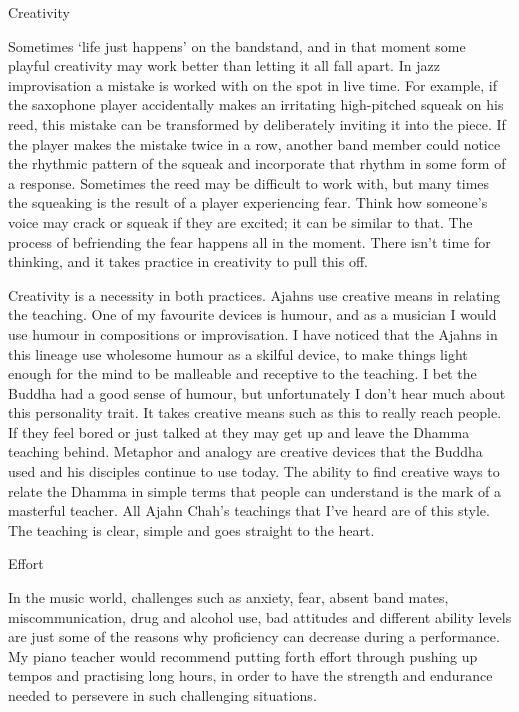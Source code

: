 Creativity

Sometimes `life just happens' on the bandstand, and in that moment some
playful creativity may work better than letting it all fall apart. In
jazz improvisation a mistake is worked with on the spot in live time.
For example, if the saxophone player accidentally makes an irritating
high-pitched squeak on his reed, this mistake can be transformed by
deliberately inviting it into the piece. If the player makes the mistake
twice in a row, another band member could notice the rhythmic pattern of
the squeak and incorporate that rhythm in some form of a response.
Sometimes the reed may be difficult to work with, but many times the
squeaking is the result of a player experiencing fear. Think how
someone's voice may crack or squeak if they are excited; it can be
similar to that. The process of befriending the fear happens all in the
moment. There isn't time for thinking, and it takes practice in
creativity to pull this off.

Creativity is a necessity in both practices. Ajahns use creative means
in relating the teaching. One of my favourite devices is humour, and as
a musician I would use humour in compositions or improvisation. I have
noticed that the Ajahns in this lineage use wholesome humour as a
skilful device, to make things light enough for the mind to be malleable
and receptive to the teaching. I bet the Buddha had a good sense of
humour, but unfortunately I don't hear much about this personality
trait. It takes creative means such as this to really reach people. If
they feel bored or just talked at they may get up and leave the Dhamma
teaching behind. Metaphor and analogy are creative devices that the
Buddha used and his disciples continue to use today. The ability to find
creative ways to relate the Dhamma in simple terms that people can
understand is the mark of a masterful teacher. All Ajahn Chah's
teachings that I've heard are of this style. The teaching is clear,
simple and goes straight to the heart.

Effort

In the music world, challenges such as anxiety, fear, absent band mates,
miscommunication, drug and alcohol use, bad attitudes and different
ability levels are just some of the reasons why proficiency can decrease
during a performance. My piano teacher would recommend putting forth
effort through pushing up tempos and practising long hours, in order to
have the strength and endurance needed to persevere in such challenging
situations.

